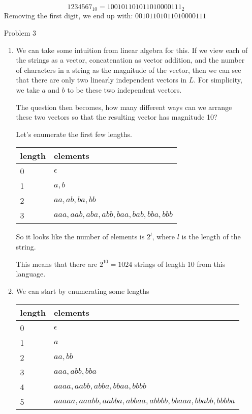 \documentclass[12pt,letterpaper]{article}
\begin{document}
\begin{enumerate}
      \[1234567_{10} = 100101101011010000111_2\]
      Removing the first digit, we end up with: $00101101011010000111$

    \item[Problem 3]
      \begin{enumerate}
        \item
          We can take some intuition from linear algebra for this.
          If we view each of the strings as a vector,
          concatenation as vector addition,
          and the number of characters in a string as the magnitude of the vector,
          then we can see that there are only two linearly independent vectors in $L$.
          For simplicity, we take $a$ and $b$ to be these two independent vectors.

          The question then becomes,
          how many different ways can we arrange these two vectors so that the resulting vector has magnitude 10?

          Let's enumerate the first few lengths.

          \begin{tabular}{l | l}
            \multicolumn{1}{l}{length} & \multicolumn{1}{l}{elements} \\
            \hline
            0 & $\epsilon$\\
            1 & $a, b$ \\
            2 & $aa, ab, ba, bb$ \\
            3 & $aaa, aab, aba, abb, baa, bab, bba, bbb$
          \end{tabular}

          So it looks like the number of elements is $2^{l}$, where $l$ is the length of the string.

          This means that there are $2^10 = 1024$ strings of length 10 from this language.

        \item
          We can start by enumerating some lengths

          \begin{tabular}{l | l}
            \multicolumn{1}{l}{length} & \multicolumn{1}{l}{elements} \\
            \hline
            0 & $\epsilon$\\
            1 & $a$ \\
            2 & $aa, bb$ \\
            3 & $aaa, abb, bba$ \\
            4 & $aaaa, aabb, abba, bbaa, bbbb$ \\
            5 & $aaaaa, aaabb, aabba, abbaa, abbbb, bbaaa, bbabb, bbbba$
          \end{tabular}


\end{enumerate}
\end{enumerate}
\end{document}
